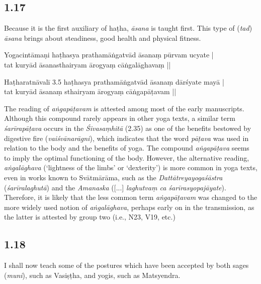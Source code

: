 \begin{ekdosis}
\subsection*{1.17}
\begin{translation}[hp01_017]
Because it is the first auxiliary of haṭha, \emph{āsana} is taught first. This type of (\emph{tad}) \emph{āsana} brings about steadiness, good health and physical fitness.
\end{translation}

\begin{testimonia}[hp01_017]
Yogacintāmaṇi
\startverse
haṭhasya prathamāṅgatvād āsanaṃ pūrvam ucyate |\\
tat kuryād āsanasthairyam ārogyaṃ cāṅgalāghavaṃ ||
\endverse

Haṭharatnāvalī 3.5
\startverse
haṭhasya prathamāṅgatvād āsanaṃ dārśyate mayā |\\
tat kuryād āsanaṃ sthairyam ārogyaṃ cāṅgapāṭavam || 
\endverse
\end{testimonia}

\begin{philcomm}[hp01_017]        
The reading of \emph{aṅgapāṭavam} is attested among most of the early manuscripts. Although this compound rarely appears in other yoga texts, a similar term \emph{śarīrapāṭava} occurs in the \emph{Śivasaṃhitā} (2.35) as one of the benefits bestowed by digestive fire (\emph{vaiśvānarāgni}), which indicates that the word \emph{pāṭava} was used in relation to the body and the benefits of yoga. The compound \emph{aṅgapāṭava} seems to imply the optimal functioning of the body. However, the alternative reading, \emph{aṅgalāghava} (‘lightness of the limbs’ or ‘dexterity’) is more common in yoga texts, even in works known to Svātmārāma, such as the \emph{Dattātreyayogaśāstra} (\emph{śarīralaghutā}) and the \textit{Amanaska} ([...] \emph{laghutvaṃ ca śarīrasyopajāyate}). Therefore, it is likely that the less common term \emph{aṅgapāṭavam} was changed to the more widely used notion of \emph{aṅgalāghava}, perhaps early on in the transmission, as the latter is attested by group two (i.e., N23, V19, etc.) 
\end{philcomm}

\subsection*{1.18}
\begin{translation}[hp01_018]
I shall now teach some of the postures which have been accepted by both sages (\emph{muni}), such as Vasiṣṭha, and yogis, such as Matsyendra.
\end{translation}


\end{ekdosis}
